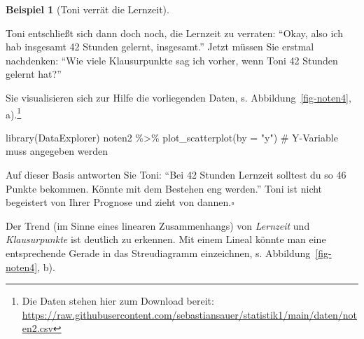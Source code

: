 \documentclass[
  letterpaper,
]{scrbook}
\newenvironment{Shaded}{\begin{snugshade}}{\end{snugshade}}
\newcommand{\AttributeTok}[1]{\textcolor[rgb]{0.40,0.45,0.13}{#1}}
\newcommand{\CommentTok}[1]{\textcolor[rgb]{0.37,0.37,0.37}{#1}}
\newcommand{\FunctionTok}[1]{\textcolor[rgb]{0.28,0.35,0.67}{#1}}
\newcommand{\NormalTok}[1]{\textcolor[rgb]{0.00,0.23,0.31}{#1}}
\newcommand{\SpecialCharTok}[1]{\textcolor[rgb]{0.37,0.37,0.37}{#1}}
\newcommand{\StringTok}[1]{\textcolor[rgb]{0.13,0.47,0.30}{#1}}
\theoremstyle{definition}
\newtheorem{example}{Beispiel}[chapter]
\theoremstyle{definition}
\theoremstyle{definition}
\theoremstyle{remark}
\begin{document}
\begin{example}[Toni verrät die
Lernzeit]\protect\hypertarget{exm-noten3}{}\label{exm-noten3}

Toni entschließt sich dann doch noch, die Lernzeit zu verraten: ``Okay,
also ich hab insgesamt 42 Stunden gelernt, insgesamt.'' Jetzt müssen Sie
erstmal nachdenken: ``Wie viele Klausurpunkte sag ich vorher, wenn Toni
42 Stunden gelernt hat?''

Sie visualisieren sich zur Hilfe die vorliegenden Daten, s.
Abbildung~\ref{fig-noten4}, a).\footnote{Die Daten stehen hier zum
  Download bereit:
  \url{https://raw.githubusercontent.com/sebastiansauer/statistik1/main/daten/noten2.csv}}

\begin{Shaded}
\begin{Highlighting}[]
\FunctionTok{library}\NormalTok{(DataExplorer)}
\NormalTok{noten2 }\SpecialCharTok{\%\textgreater{}\%} 
  \FunctionTok{plot\_scatterplot}\NormalTok{(}\AttributeTok{by =} \StringTok{"y"}\NormalTok{)  }\CommentTok{\# Y{-}Variable muss angegeben werden}
\end{Highlighting}
\end{Shaded}

Auf dieser Basis antworten Sie Toni: ``Bei 42 Stunden Lernzeit solltest
du so 46 Punkte bekommen. Könnte mit dem Bestehen eng werden.'' Toni ist
nicht begeistert von Ihrer Prognose und zieht von dannen.\(\square\)

\end{example}

Der Trend (im Sinne eines linearen Zusammenhangs) von \emph{Lernzeit}
und \emph{Klausurpunkte} ist deutlich zu erkennen. Mit einem Lineal
könnte man eine entsprechende Gerade in das Streudiagramm einzeichnen,
s. Abbildung~\ref{fig-noten4}, b).
\end{document}
